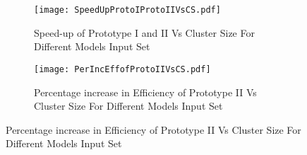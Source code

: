 \begin{figure}
\centering
\captionsetup[subfigure]{labelformat=empty}
\begin{subfigure}
\centering
\texttt{[image: SpeedUpProtoIProtoIIVsCS.pdf]}
\label{fig:SpeedUpProtoIProtoIIVsCS}
\caption{Speed-up of Prototype I and II Vs Cluster Size For Different Models Input Set}
\end{subfigure}
\begin{subfigure}
\centering
\texttt{[image: PerIncEffofProtoIIVsCS.pdf]}
\caption{ Percentage increase in Efficiency of Prototype II Vs Cluster Size For Different Models Input Set}
\label{fig:PerIncEffofProtoIIVsCS}
\end{subfigure}
\end{figure}


\begin{table}[]
\centering
\caption{Prototype I vs Prototype II Measurements for 10 Head Models}
\label{ProtoIVsProtoII-CS}
\end{table}
